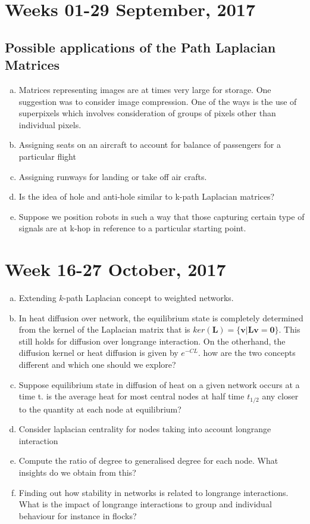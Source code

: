 \documentclass[10pt,a4paper]{article}
\begin{document}
\section{Weeks 01-29 September, 2017}
\subsection{Possible applications of the Path Laplacian Matrices}
\begin{enumerate}[a)]
	\item Matrices representing images are at times very large for storage. One suggestion was to consider image compression. One of the ways is the use of superpixels which involves consideration of groups of pixels other than individual pixels.
	\item Assigning seats on an aircraft to account for balance of passengers for a particular flight
	\item Assigning runways for landing or take off air crafts.
	\item Is the idea of hole and anti-hole similar to k-path Laplacian matrices?
	\item Suppose we position robots in such a way that those capturing certain type of signals are at k-hop in reference to a particular starting point.
\end{enumerate}

\newpage

\section*{Week 16-27 October, 2017}
\begin{enumerate}[a)]
	\item Extending $k$-path Laplacian concept to weighted networks.
	\item In heat diffusion over network, the equilibrium state is completely determined from the kernel of the Laplacian matrix that is $ker(\mathbf{L}) = \{\mathbf{v} | \mathbf{L}\mathbf{v}= \mathbf{0}\}$. This still holds for diffusion over longrange interaction. On the otherhand, the diffusion kernel or heat diffusion is given by $e^{-CL}$. how are the two concepts different and which one should we explore?
	\item Suppose equilibrium state in diffusion of heat on a given network occurs at a time t. is the average heat for most central nodes at half time $t_{1/2}$ any closer to the quantity at each node at equilibrium?
	\item Consider laplacian centrality for nodes taking into account longrange interaction
	\item Compute the ratio of degree to generalised degree for each node. What insights do we obtain from this?
	\item Finding out how stability in networks is related to longrange interactions. What is the impact of longrange interactions to group and individual behaviour for instance in flocks?
	
\end{enumerate}
\newpage
\end{document}
